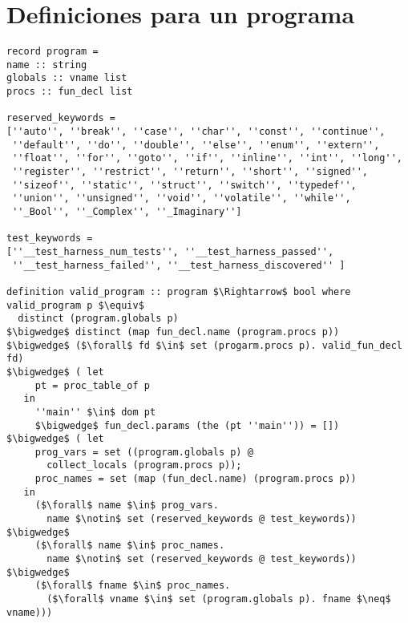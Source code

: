 \chapter{Definiciones para un programa}
\label{ap:prog_def}

\begin{lstlisting}[mathescape=true]
record program =
name :: string
globals :: vname list
procs :: fun_decl list

reserved_keywords =
[''auto'', ''break'', ''case'', ''char'', ''const'', ''continue'',
 ''default'', ''do'', ''double'', ''else'', ''enum'', ''extern'',
 ''float'', ''for'', ''goto'', ''if'', ''inline'', ''int'', ''long'',
 ''register'', ''restrict'', ''return'', ''short'', ''signed'',
 ''sizeof'', ''static'', ''struct'', ''switch'', ''typedef'',
 ''union'', ''unsigned'', ''void'', ''volatile'', ''while'',
 ''_Bool'', ''_Complex'', ''_Imaginary'']

test_keywords =
[''__test_harness_num_tests'', ''__test_harness_passed'',
 ''__test_harness_failed'', ''__test_harness_discovered'' ]

definition valid_program :: program $\Rightarrow$ bool where
valid_program p $\equiv$
  distinct (program.globals p)
$\bigwedge$ distinct (map fun_decl.name (program.procs p))
$\bigwedge$ ($\forall$ fd $\in$ set (progarm.procs p). valid_fun_decl fd)
$\bigwedge$ ( let
     pt = proc_table_of p
   in
     ''main'' $\in$ dom pt
     $\bigwedge$ fun_decl.params (the (pt ''main'')) = [])
$\bigwedge$ ( let
     prog_vars = set ((program.globals p) @
       collect_locals (program.procs p));
     proc_names = set (map (fun_decl.name) (program.procs p))
   in
     ($\forall$ name $\in$ prog_vars.
       name $\notin$ set (reserved_keywords @ test_keywords)) $\bigwedge$
     ($\forall$ name $\in$ proc_names.
       name $\notin$ set (reserved_keywords @ test_keywords)) $\bigwedge$
     ($\forall$ fname $\in$ proc_names.
       ($\forall$ vname $\in$ set (program.globals p). fname $\neq$ vname)))
\end{lstlisting}
